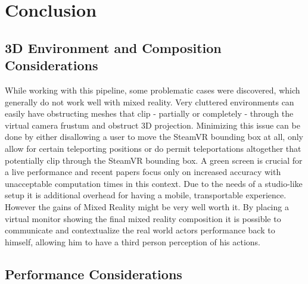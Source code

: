 %
\chapter{Conclusion}

\section{3D Environment and Composition Considerations}

While working with this pipeline, some problematic cases were discovered, which 
generally do not work well with mixed reality. Very cluttered environments can 
easily have obstructing meshes that clip - partially or completely - through 
the virtual camera frustum and obstruct 3D projection. Minimizing this issue 
can be done by either disallowing a user to move the SteamVR bounding box at 
all, only allow for certain teleporting positions or do permit teleportations 
altogether that potentially clip through the SteamVR bounding box.
\newline
A green screen is crucial for a live performance and recent papers focus only 
on increased accuracy with unacceptable computation times in this context. Due 
to the needs of a studio-like setup it is additional overhead for having a 
mobile, transportable experience. However the gains of Mixed Reality might be 
very well worth it. 
\newline
By placing a virtual monitor showing the final mixed reality composition it is 
possible to communicate and contextualize the real world actors performance 
back to himself, allowing him to have a third person perception of his actions.

\section{Performance Considerations}

